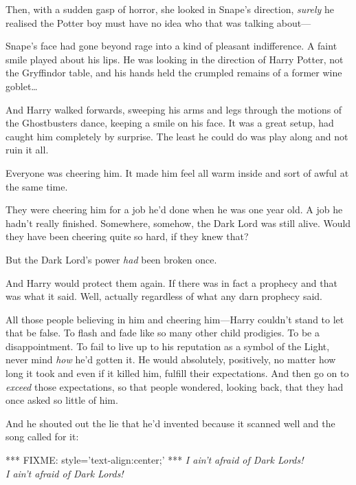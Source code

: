 Then, with a sudden gasp of horror, she looked in Snape's direction, 
\emph{surely} he realised the Potter boy must have no idea who that was talking 
about---

Snape's face had gone beyond rage into a kind of pleasant indifference. A faint 
smile played about his lips. He was looking in the direction of Harry Potter, 
not the Gryffindor table, and his hands held the crumpled remains of a former 
wine goblet{\ldots}

And Harry walked forwards, sweeping his arms and legs through the motions of 
the Ghostbusters dance, keeping a smile on his face. It was a great setup, had 
caught him completely by surprise. The least he could do was play along and not 
ruin it all.

Everyone was cheering him. It made him feel all warm inside and sort of awful 
at the same time.

They were cheering him for a job he'd done when he was one year old. A job he 
hadn't really finished. Somewhere, somehow, the Dark Lord was still alive. 
Would they have been cheering quite so hard, if they knew that?

But the Dark Lord's power \emph{had} been broken once.

And Harry would protect them again. If there was in fact a prophecy and that 
was what it said. Well, actually regardless of what any darn prophecy said.

All those people believing in him and cheering him---Harry couldn't stand to 
let that be false. To flash and fade like so many other child prodigies. To be 
a disappointment. To fail to live up to his reputation as a symbol of the 
Light, never mind \emph{how} he'd gotten it. He would absolutely, positively, 
no matter how long it took and even if it killed him, fulfill their 
expectations. And then go on to \emph{exceed} those expectations, so that 
people wondered, looking back, that they had once asked so little of him.

And he shouted out the lie that he'd invented because it scanned well and the 
song called for it:

*** FIXME: style='text-align:center;' ***
\emph{I ain't afraid of Dark Lords!\\
I ain't afraid of Dark Lords!}

